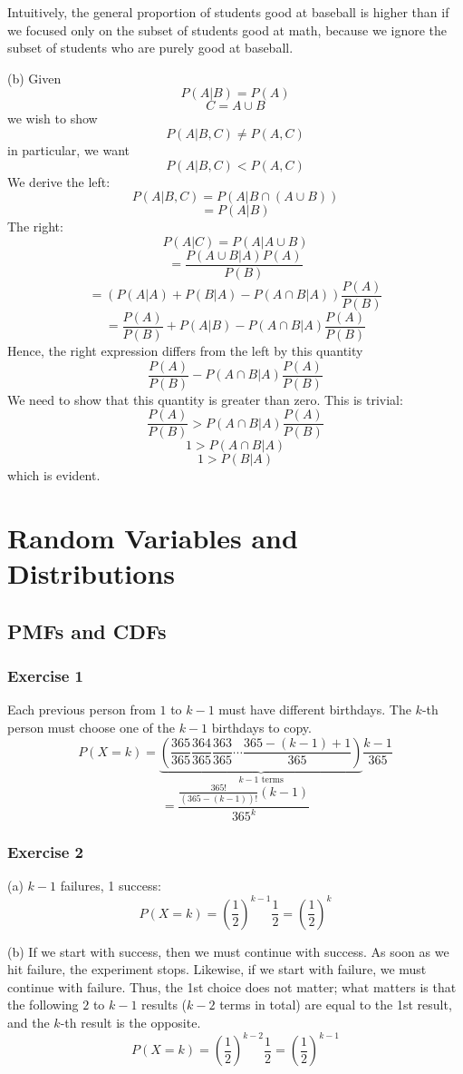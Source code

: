 \documentclass{book}
\begin{document}
Intuitively, the general proportion of students good at baseball is higher than if we focused only on the subset of students good at math, because we ignore the subset of students who are purely good at baseball.

\noindent
(b)
Given
$$P(A | B) = P(A)$$
$$C = A \cup B$$
we wish to show
$$P(A | B, C) \neq P(A, C)$$
in particular, we want
$$P(A | B, C) < P(A, C)$$
We derive the left:
$$P(A | B, C) = P(A | B \cap (A \cup B))$$
$$= P(A | B)$$
The right:
$$P(A | C) = P(A | A \cup B)$$
$$= \frac{P(A \cup B | A) P(A)}{P(B)}$$
$$= (P(A | A) + P(B | A) - P(A \cap B | A)) \frac{P(A)}{P(B)}$$
$$= \frac{P(A)}{P(B)} + P(A | B) - P(A \cap B | A) \frac{P(A)}{P(B)}$$
Hence, the right expression differs from the left by this quantity
$$\frac{P(A)}{P(B)} - P(A \cap B | A) \frac{P(A)}{P(B)}$$
We need to show that this quantity is greater than zero. This is trivial:
$$\frac{P(A)}{P(B)} > P(A \cap B | A) \frac{P(A)}{P(B)}$$
$$1 > P(A \cap B | A)$$
$$1 > P(B | A)$$
which is evident.

\chapter{Random Variables and Distributions}

\section{PMFs and CDFs}

\subsection*{Exercise 1}
Each previous person from $1$ to $k - 1$ must have different birthdays. The $k$-th person must choose one of the $k - 1$ birthdays to copy.
$$P(X = k) = \underbrace{\left(\frac{365}{365} \frac{364}{365} \frac{363}{365} \cdots \frac{365 - (k - 1) + 1}{365}\right)}_{k - 1 \text{ terms}} \frac{k - 1}{365}$$
$$= \frac{\frac{365!}{(365 - (k - 1))!} (k - 1)}{365^k}$$

\subsection*{Exercise 2}
(a) $k - 1$ failures, 1 success:
$$P(X = k) = \left(\frac{1}{2}\right)^{k - 1} \frac{1}{2} = \left(\frac{1}{2}\right)^k$$

\noindent
(b) If we start with success, then we must continue with success. As soon as we hit failure, the experiment stops. Likewise, if we start with failure, we must continue with failure. Thus, the 1st choice does not matter; what matters is that the following $2$ to $k - 1$ results ($k - 2$ terms in total) are equal to the 1st result, and the $k$-th result is the opposite.
$$P(X = k) = \left(\frac{1}{2}\right)^{k - 2} \frac{1}{2} = \left(\frac{1}{2}\right)^{k - 1}$$
\end{document}
